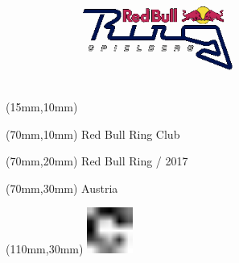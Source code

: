 \null\newpage
\begin{textblock*}{50mm}(15mm,10mm)%
\includegraphics[width=50mm]{LG/RED.png}
\end{textblock*}
\begin{textblock*}{130mm}(70mm,10mm)%
{\fontsize{20}{20}\selectfont Red Bull Ring Club}\\
\end{textblock*}
\begin{textblock*}{120mm}(70mm,20mm)%
{\fontsize{16}{16}\selectfont Red Bull Ring / 2017}\\
\end{textblock*}
\begin{textblock*}{120mm}(70mm,30mm)%
{\fontsize{12}{12}\selectfont Austria}
\end{textblock*}
\begin{textblock*}{30mm}(110mm,30mm)%
\centering
\includegraphics[height=15mm]{icons/fa-rotate-right.pdf}
\end{textblock*}
